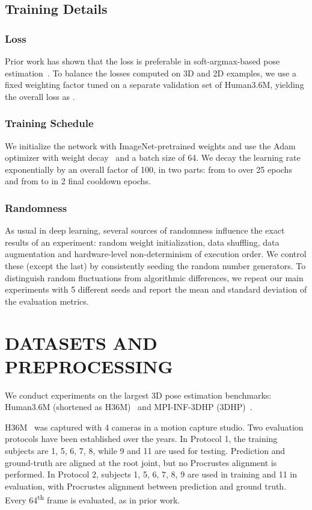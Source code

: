 \subsection{Training Details}
\subsubsection{Loss} Prior work has shown that the  loss is preferable in soft-argmax-based pose estimation~\cite{Sun18ECCV}.
To balance the losses computed on 3D and 2D examples, we use a fixed weighting factor tuned on a separate validation set of Human3.6M, yielding the overall loss as .

\subsubsection{Training Schedule} We initialize the network with ImageNet-pretrained weights and use the Adam optimizer with weight decay~\cite{Loshchilov19ICLR} and a batch size of 64.
We decay the learning rate exponentially by an overall factor of 100, in two parts: from  to  over 25 epochs and from  to  in 2 final cooldown epochs.

\subsubsection{Randomness} As usual in deep learning, several sources of randomness influence the exact results of an experiment: random weight initialization, data shuffling, data augmentation and hardware-level non-determinism of execution order.
We control these (except the last) by consistently seeding the random number generators.
To distinguish random fluctuations from algorithmic differences, we repeat our main experiments with 5 different seeds and report the mean and standard deviation of the evaluation metrics.
\section{\uppercase{Datasets and Preprocessing}}
We conduct experiments on the largest 3D pose estimation benchmarks: Human3.6M (shortened as H36M)~\cite{Ionescu11ICCV,Ionescu14PAMI} and MPI-INF-3DHP (3DHP)~\cite{Mehta17TDV}.

H36M~\cite{Ionescu11ICCV,Ionescu14PAMI} was captured with 4 cameras in a motion capture studio.
Two evaluation protocols have been established over the years.
In Protocol 1, the training subjects are 1, 5, 6, 7, 8, while 9 and 11 are used for testing.
Prediction and ground-truth are aligned at the root joint, but no Procrustes alignment is performed.
In Protocol 2, subjects 1, 5, 6, 7, 8, 9 are used in training and 11 in evaluation, with Procrustes alignment between prediction and ground truth.
Every 64\textsuperscript{th} frame is evaluated, as in prior work.

